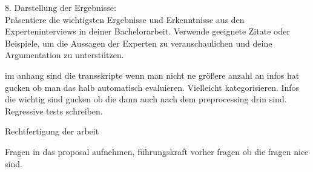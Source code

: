 8. Darstellung der Ergebnisse:\\
Präsentiere die wichtigsten Ergebnisse und Erkenntnisse aus den Experteninterviews in deiner Bachelorarbeit. Verwende geeignete Zitate oder Beispiele, um die Aussagen der Experten zu veranschaulichen und deine Argumentation zu unterstützen.
\cite{maguire2002user}

im anhang sind die transskripte
wenn man nicht ne größere anzahl an infos hat gucken ob man das halb automatisch evaluieren. Vielleicht kategorisieren. Infos die wichtig sind gucken ob die dann auch nach dem preprocessing drin sind. Regressive tests schreiben.

Rechtfertigung der arbeit

Fragen in das proposal aufnehmen, führungskraft vorher fragen ob die fragen nice sind.
\newpage